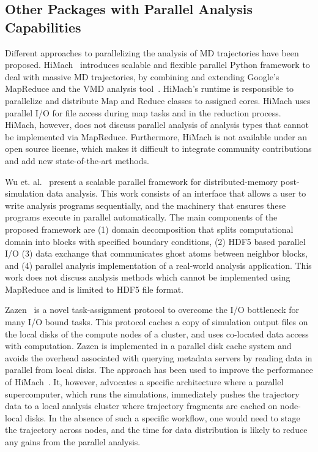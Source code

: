 \subsection{Other Packages with Parallel Analysis Capabilities}
\label{sec:otherparallel}

Different approaches to parallelizing the analysis of MD trajectories have been proposed.
HiMach~\cite{himach-2008} introduces scalable and flexible parallel Python framework to deal with massive MD trajectories, by combining and extending Google's MapReduce and the VMD analysis tool~\cite{Hum96}. 
HiMach's runtime is responsible to parallelize and distribute Map and Reduce classes to assigned cores.
HiMach uses parallel I/O for file access during map tasks and  in the reduction process. 
HiMach, however, does not discuss parallel analysis of analysis types that cannot be implemented via MapReduce.
Furthermore, HiMach is not available under an open source license, which makes it difficult to integrate community contributions and add new state-of-the-art methods.

Wu et. al.~\cite{Wu_et.al} present a scalable parallel framework for distributed-memory post-simulation data analysis.
This work consists of an interface that allows a user to write analysis programs sequentially, and the machinery that ensures these programs execute in parallel automatically. 
The main components of the proposed framework are (1) domain decomposition that splits computational domain into blocks with specified boundary conditions, (2) HDF5 based parallel I/O (3) data exchange that communicates ghost atoms between neighbor blocks, and (4) parallel analysis implementation of a real-world analysis application.
This work does not discuss analysis methods which cannot be implemented using MapReduce and is limited to HDF5 file format.

Zazen~\cite{Zazen} is a novel task-assignment protocol to overcome the I/O bottleneck for many I/O bound tasks. This protocol caches a copy of simulation output files on the local disks of the compute nodes of a cluster, and uses co-located data access with computation. 
Zazen is implemented in a parallel disk cache system and avoids the overhead associated with querying metadata servers by reading data in parallel from local disks.
The approach has been used to improve the performance of HiMach~\cite{himach-2008}.
It, however, advocates a specific architecture where a parallel supercomputer, which runs the simulations, immediately pushes the trajectory data to a local analysis cluster where trajectory fragments are cached on node-local disks.
In the absence of such a specific  workflow, one would need to stage the trajectory across nodes, and the time for data distribution is likely to reduce any gains from the parallel analysis.

